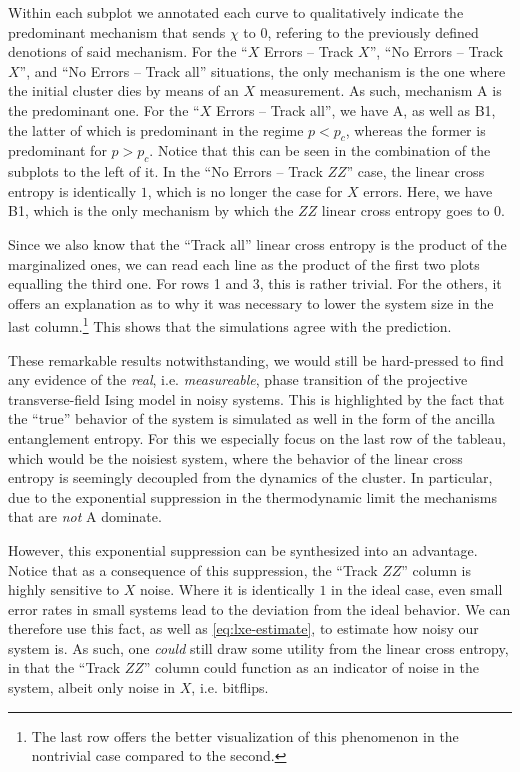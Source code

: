 Within each subplot we annotated each curve to qualitatively indicate the
predominant mechanism that sends $\chi$ to $0$, refering to the previously
defined denotions of said mechanism. For the \enquote{$X$ Errors -- Track $X$},
\enquote{No Errors -- Track $X$}, and \enquote{No Errors -- Track all}
situations, the only mechanism is the one where the initial cluster dies by
means of an $X$ measurement. As such, mechanism \textsf{A} is the predominant
one. For the \enquote{$X$ Errors -- Track all}, we have \textsf{A}, as well as
\textsf{B1}, the latter of which is predominant in the regime $p<p_c$, whereas
the former is predominant for $p> p_c$. Notice that this can be seen in the
combination of the subplots to the left of it. In the \enquote{No Errors --
Track $ZZ$} case, the linear cross entropy is identically $1$, which is no
longer the case for $X$ errors. Here, we have \textsf{B1}, which is the only
mechanism by which the $ZZ$ linear cross entropy goes to 0.

Since we also know that the \enquote{Track all} linear cross entropy is the
product of the marginalized ones, we can read each line as the product of the
first two plots equalling the third one. For rows 1 and 3, this is rather
trivial. For the others, it offers an explanation as to why it was necessary to
lower the system size in the last column.\footnote{The last row offers the
better visualization of this phenomenon in the nontrivial case compared to the
second.} This shows that the simulations agree with the prediction.

These remarkable results notwithstanding, we would still be hard-pressed to
find any evidence of the \emph{real}, i.e. \emph{measureable}, phase transition
of the projective transverse-field Ising model in noisy systems. This is highlighted by the fact
that the \enquote{true} behavior of the system is simulated as well in the form
of the ancilla entanglement entropy. For this we especially focus on the last
row of the tableau, which would be the noisiest system, where the behavior of
the linear cross entropy is seemingly decoupled from the dynamics of the
cluster. In particular, due to the exponential suppression in the
thermodynamic limit the mechanisms that are \emph{not} \textsf{A} dominate.  

However, this exponential suppression can be synthesized
into an advantage. Notice that as a consequence of this
suppression, the \enquote{Track $ZZ$} column is highly sensitive to $X$ noise.
Where it is identically $1$ in the ideal case, even small error rates in small
systems lead to the deviation from the ideal behavior. We can therefore use
this fact, as well as \cref{eq:lxe-estimate}, to estimate how noisy our system
is. As such, one \emph{could} still draw some utility from the linear cross
entropy, in that the \enquote{Track $ZZ$} column could function as an indicator
of noise in the system, albeit only noise in $X$, i.e. bitflips. 


